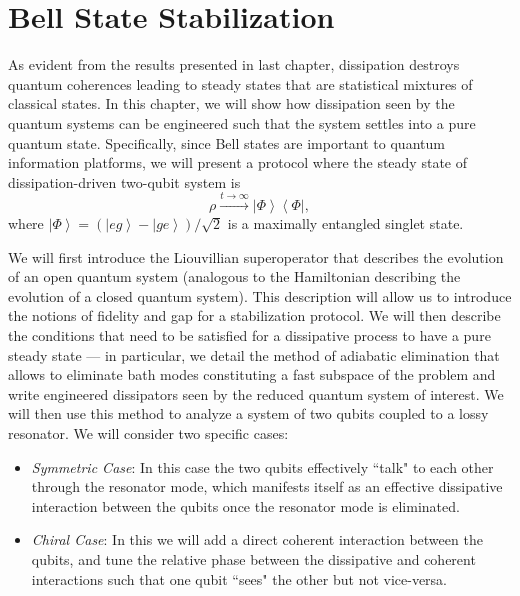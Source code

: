 \chapter{Bell State Stabilization}
%
As evident from the results presented in last chapter, dissipation destroys quantum coherences leading to steady states that are statistical mixtures of classical states. In this chapter, we will show how dissipation seen by the quantum systems can be engineered such that the system settles into a pure quantum state. Specifically, since Bell states are important to quantum information platforms, we will present a protocol where the steady state of dissipation-driven two-qubit system is
%
\begin{equation}
\rho \xrightarrow{t\rightarrow\infty} \left|\Phi\right\rangle\left\langle\Phi \right|,
\end{equation}
%
where $\left|\Phi \right\rangle = (\left|eg \right\rangle- \left|ge \right\rangle)/\sqrt{2}$ is a maximally entangled singlet state. 
%
\par
%
We will first introduce the Liouvillian superoperator that describes the evolution of an open quantum system (analogous to the Hamiltonian describing the evolution of a closed quantum system). This description will allow us to introduce the notions of fidelity and gap for a stabilization protocol. We will then describe the conditions that need to be satisfied for a dissipative process to have a pure steady state --- in particular, we detail the method of adiabatic elimination that allows to eliminate bath modes constituting a fast subspace of the problem and write engineered dissipators seen by the reduced quantum system of interest. We will then use this method to analyze a system of two qubits coupled to a lossy resonator. We will consider two specific cases:
%
\begin{itemize}
\item \emph{Symmetric Case}: In this case the two qubits effectively ``talk" to each other through the resonator mode, which manifests itself as an effective dissipative interaction between the qubits once the resonator mode is eliminated. 
\item \emph{Chiral Case}: In this we will add a direct coherent interaction between the qubits, and tune the relative phase between the dissipative and coherent interactions such that one qubit ``sees" the other but not vice-versa. 
\end{itemize}
%
%
